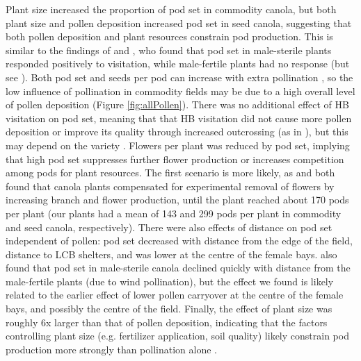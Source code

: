 \documentclass[12pt]{article} %
\begin{document}

Plant size increased the proportion of pod set in commodity canola, but both plant size and pollen deposition increased pod set in seed canola, suggesting that both pollen deposition and plant resources constrain pod production.
This is similar to the findings of \citet{mesquida1981} and \citet{steffan2003}, who found that pod set in male-sterile plants responded positively to visitation, while male-fertile plants had no response (but see \citealp{adegas1992}).
Both pod set and seeds per pod can increase with extra pollination \citep{jauker2008,sabbahi2005,sabbahi2006,duran2010}, so the low influence of pollination in commodity fields may be due to a high overall level of pollen deposition (Figure \ref{fig:allPollen}).
There was no additional effect of HB visitation on pod set, meaning that that HB visitation did not cause more pollen deposition or improve its quality through increased outcrossing (as in \citealt{rosa2011}), but this may depend on the variety \citep{marini2015, adamidis2019}.
Flowers per plant was reduced by pod set, implying that high pod set suppresses further flower production or increases competition among pods for plant resources.
The first scenario is more likely, as \citet{sabbahi2006} and \citet{mesquida1981} both found that canola plants compensated for experimental removal of flowers by increasing branch and flower production, until the plant reached about 170 pods per plant (our plants had a mean of 143 and 299 pods per plant in commodity and seed canola, respectively).
There were also effects of distance on pod set independent of pollen: pod set decreased with distance from the edge of the field, distance to LCB shelters, and was lower at the centre of the female bays.
\citet{mesquida1978} also found that pod set in male-sterile canola declined quickly with distance from the male-fertile plants (due to wind pollination), but the effect we found is likely related to the earlier effect of lower pollen carryover at the centre of the female bays, and possibly the centre of the field.
Finally, the effect of plant size was roughly 6x larger than that of pollen deposition, indicating that the factors controlling plant size (e.g. fertilizer application, soil quality) likely constrain pod production more strongly than pollination alone \citep{marini2015,tamburini2017, gagic2017, tamburini2019}. 
\end{document}
